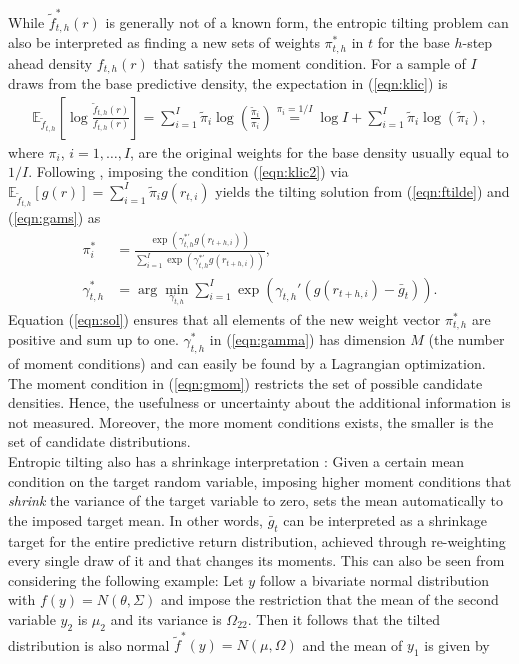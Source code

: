 While $\tilde{f}_{t,h}^*(r)$ is generally not of a known form, the entropic tilting problem can also be interpreted as finding a new sets of weights $\pi_{t,h}^*$ in $t$ for the base $h$-step ahead density $f_{t,h}(r)$ that satisfy the moment condition. For a sample of $I$ draws from the base predictive density, the expectation in (\ref{eqn:klic}) is 
\begin{align}
	\mathbb{E}_{\tilde{f}_{t,h}}\left[\log\frac{\tilde{f}_{t,h}(r)}{f_{t,h}(r)}\right]=\sum_{i=1}^I\tilde{\pi}_i\log\left(\frac{\tilde{\pi}_i}{\pi_i}\right)\stackrel{\pi_i=1/I}{=}\log{I}+\sum_{i=1}^I\tilde{\pi}_i\log\left(\tilde{\pi}_i\right),
\end{align}
where $\pi_i$, $i=1,\ldots,I$, are the original weights for the base density usually equal to $1/I$. Following \cite{robertson2005}, imposing the condition (\ref{eqn:klic2}) via $\mathbb{E}_{\tilde{f}_{t,h}}\left[g(r)\right]=\sum_{i=1}^I\tilde{\pi}_ig(r_{t,i})$ yields the tilting solution from (\ref{eqn:ftilde}) and (\ref{eqn:gams}) as
\begin{align}\label{eqn:sol}
	\pi_i^*&=\frac{\exp\left(\gamma_{t,h}^{*'}g(r_{t+h,i})\right)}{\sum_{i=1}^I\exp\left(\gamma_{t,h}^{*'}g(r_{t+h,i})\right)},\\\label{eqn:gamma}
	\gamma_{t,h}^*&=\arg\min_{\gamma_{t,h}}\sum_{i=1}^I\exp\left(\gamma_{t,h}'(g(r_{t+h,i})-\bar{g}_t)\right).
\end{align}
Equation (\ref{eqn:sol}) ensures that all elements of the new weight vector $\pi_{t,h}^*$ are positive and sum up to one. $\gamma_{t,h}^*$ in (\ref{eqn:gamma}) has dimension $M$ (the number of moment conditions) and can easily be found by a Lagrangian optimization.\\
%
\indent The moment condition in (\ref{eqn:gmom}) restricts the set of possible candidate densities. Hence, the usefulness or uncertainty about the additional information is not measured. Moreover, the more moment conditions exists, the smaller is the set of candidate distributions.\\
%
\indent Entropic tilting also has a shrinkage interpretation \citep[][p. 394]{robertson2005}: Given a certain mean condition on the target random variable, imposing higher moment conditions that \textit{shrink} the variance of the target variable to zero, sets the mean automatically to the imposed target mean. In other words, $\bar{g}_t$ can be interpreted as a shrinkage target for the entire predictive return distribution, achieved through re-weighting every single draw of it and that changes its moments. This can also be seen from considering the following example: Let $y$ follow a bivariate normal distribution with $f(y)=N(\theta,\Sigma)$ and impose the restriction that the mean of the second variable $y_2$ is $\mu_2$ and its variance is $\Omega_{22}$. Then it follows that the tilted distribution is also normal $\tilde{f}^*(y)=N(\mu,\Omega)$ and the mean of $y_1$ is given by
